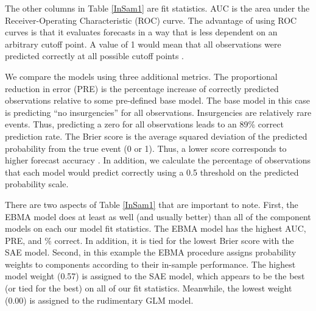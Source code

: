 \documentclass[pdftex,12pt,fullpage,oneside]{amsart}
\begin{document}
The other columns in Table \ref{InSam1} are fit statistics.  AUC is
the area under the Receiver-Operating Characteristic (ROC) curve. The
advantage of using ROC curves is that it evaluates forecasts in a way
that is less dependent on an arbitrary cutoff point.  A value of 1
would mean that all observations were predicted correctly at all
possible cutoff points \citep{King:Zeng:2001}.

We compare the models using three additional metrics.  The
proportional reduction in error (PRE) is the percentage increase of
correctly predicted observations relative to some pre-defined base
model. The base model in this case is predicting ``no insurgencies''
for all observations.  Insurgencies are relatively rare events.  Thus,
predicting a zero for all observations leads to an 89\% correct
prediction rate. The Brier score is the average squared deviation of
the predicted probability from the true event (0 or 1).  Thus, a lower
score corresponds to higher forecast accuracy \citep{Brier:1950}. In
addition, we calculate the percentage of observations that each model
would predict correctly using a 0.5 threshold on the predicted
probability scale.


There are two aspects of Table \ref{InSam1} that are important to
note.  First, the EBMA model does at least as well (and usually
better) than all of the component models on each our model fit
statistics.  The EBMA model has the highest AUC, PRE, and \% correct.
In addition, it is tied for the lowest Brier score with the SAE model.
Second, in this example the EBMA procedure assigns probability weights
to components according to their in-sample performance.  The highest
model weight (0.57) is assigned to the SAE model, which appears to be
the best (or tied for the best) on all of our fit
statistics. Meanwhile, the lowest weight (0.00) is assigned to the
rudimentary GLM model.


\end{document}
